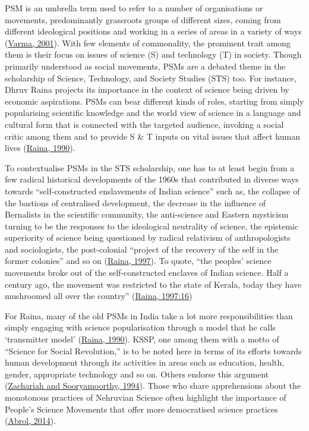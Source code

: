 \documentclass[twoside, 13pt]{article}
\begin{document}
{\fontsize{12}{14}\selectfont PSM is an umbrella term used to refer to a number of organisations or movements, predominantly grassroots groups of different sizes, coming from different ideological positions and working in a series of areas in a variety of ways (\underline{Varma, 2001}). With few elements of commonality, the prominent trait among them is their focus on issues of science (S) and technology (T) in society. Though primarily understood as social movements, PSMs are a debated theme in the scholarship of Science, Technology, and Society Studies (STS) too. For instance, Dhruv Raina projects its importance in the context of science being driven by economic aspirations. PSMs can bear different kinds of roles, starting from simply popularising scientific knowledge and the world view of science in a language and cultural form that is connected with the targeted audience, invoking a social critic among them and to provide S \& T inputs on vital issues that affect human lives (\underline{Raina, 1990}). 

To contextualise PSMs in the STS scholarship, one has to at least begin from a few radical historical developments of the 1960s that contributed in diverse ways towards “self-constructed enslavements of Indian science” such as, the collapse of the bastions of centralised development, the decrease in the influence of Bernalists in the scientific community, the anti-science and Eastern mysticism turning to be the responses to the ideological neutrality of science, the epistemic superiority of science being questioned by radical relativism of anthropologists and sociologists, the post-colonial “project of the recovery of the self in the former colonies” and so on (\underline{Raina, 1997}). To quote, “the peoples' science movements broke out of the self-constructed enclaves of Indian science. Half a century ago, the movement was restricted to the state of Kerala, today they have mushroomed all over the country” (\underline{Raina, 1997:16})


For Raina, many of the old PSMs in India take a lot more responsibilities than simply engaging with science popularisation through a model that he calls ‘transmitter model’ (\underline{Raina, 1990}). KSSP, one among them with a motto of “Science for Social Revolution,” is to be noted here in terms of its efforts towards human development through its activities in areas such as education, health, gender, appropriate technology and so on. Others endorse this argument (\underline{Zachariah and Sooryamoorthy, 1994}). Those who share apprehensions about the monotonous practices of Nehruvian Science often highlight the importance of People’s Science Movements that offer more democratised science practices (\underline{Abrol, 2014}).

}
\end{document}
